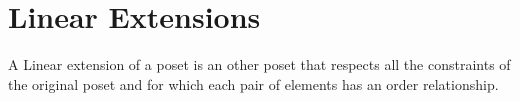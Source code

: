 \section{Linear Extensions}

A Linear extension of a poset is an other poset that respects all the constraints of the original poset and for which each pair of elements has an order relationship.
